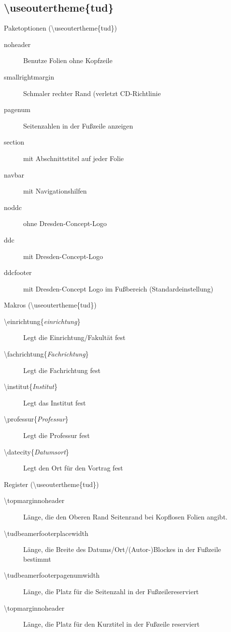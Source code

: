 \documentclass[presentation,t]{beamer}
\begin{document}
\subsection{\textbackslash useoutertheme\{tud\}}
\label{sec:org15ff8a3}
\begin{frame}[label={sec:org2ba5c2a}]{Paketoptionen (\textbackslash useoutertheme\{tud\})}
\begin{description}
\item[{noheader}] Benutze Folien ohne Kopfzeile
\item[{smallrightmargin}] Schmaler rechter Rand (verletzt CD-Richtlinie
\item[{pagenum}] Seitenzahlen in der Fußzeile anzeigen
\item[{section}] mit Abschnittstitel auf jeder Folie
\item[{navbar}] mit Navigationshilfen
\item[{noddc}] ohne Dresden-Concept-Logo
\item[{ddc}] mit Dresden-Concept-Logo
\item[{ddcfooter}] mit Dresden-Concept Logo im Fußbereich (Standardeinstellung)
\end{description}
\end{frame}
\begin{frame}[label={sec:org4ca8c91}]{Makros (\textbackslash useoutertheme\{tud\})}
\begin{description}
\item[{\textbackslash einrichtung\{\emph{einrichtung}\}}] Legt die
Einrichtung/Fakultät fest
\item[{\textbackslash fachrichtung\{\emph{Fachrichtung}\}}] Legt die
Fachrichtung fest
\item[{\textbackslash institut\{\emph{Institut}\}}] Legt das
Institut fest
\item[{\textbackslash professur\{\emph{Professur}\}}] Legt die
Professur fest
\item[{\textbackslash datecity\{\emph{Datumsort}\}}] Legt den Ort für den Vortrag fest
\end{description}
\end{frame}
\begin{frame}[label={sec:org1f459c2}]{Register (\textbackslash useoutertheme\{tud\})}
\begin{description}
\item[{\textbackslash topmarginnoheader}] Länge, die den Oberen Rand Seitenrand bei
Kopflosen Folien angibt.
\item[{\textbackslash tudbeamerfooterplacewidth}] Länge, die Breite des
Datums/Ort/(Autor-)Blockes in der Fußzeile bestimmt
\item[{\textbackslash tudbeamerfooterpagenumwidth}] Länge, die Platz für
die Seitenzahl in der Fußzeilereserviert
\item[{\textbackslash topmarginnoheader}] Länge, die Platz für den
Kurztitel in der Fußzeile reserviert
\end{description}
\end{frame}
\end{document}
